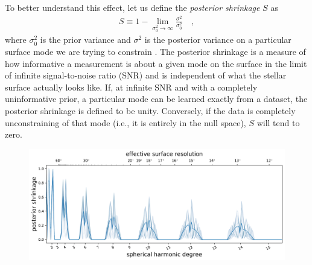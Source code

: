 \documentclass[modern]{aastex62}
\begin{document}
To better understand this effect, let us
define the \emph{posterior shrinkage} $S$ as
%
\begin{align}
    \label{eq:shrinkage}
    S \equiv 1 - \lim\limits_{\sigma_0^2 \rightarrow \infty}
    \frac{\sigma^2}{\sigma_0^2}
    \quad,
\end{align}
%
where $\sigma_0^2$ is the prior variance
and $\sigma^2$ is the posterior variance
on a particular surface mode we are trying to constrain
\citep[see, e.g.,][]{Betancourt2018}.
The posterior shrinkage is a measure of how informative a measurement is about a
given mode on the surface in the limit of infinite signal-to-noise ratio (SNR)
and is independent of what the stellar surface actually looks like.
If, at infinite SNR and with a completely uninformative prior,
a particular mode can be learned exactly from a dataset, the posterior
shrinkage is defined to be unity. Conversely, if the data is completely
unconstraining of that mode (i.e., it is entirely in the null space),
$S$ will tend to zero.

\begin{figure}[t!]
    \begin{centering}
        \includegraphics[width=\linewidth]{figures/nullspace_ensemble_single.pdf}
    \end{centering}
\end{figure}
\end{document}
